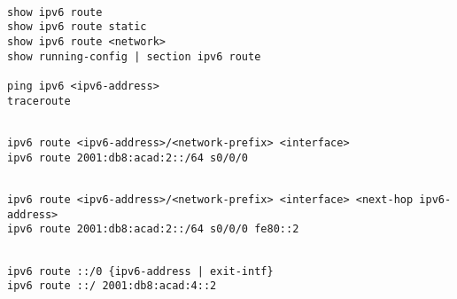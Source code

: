 \documentclass[../EngineeringJournal_CDavis.tex]{subfiles}
\begin{document}

\hspace{0.2cm}
\begin{tcolorbox}[width=6.3in]
\scriptsize
\begin{verbatim}

show ipv6 route
show ipv6 route static
show ipv6 route <network>
show running-config | section ipv6 route

ping ipv6 <ipv6-address>
traceroute

\end{verbatim}
\normalsize
\end{tcolorbox}
\hspace{0.2cm}


\hspace{0.2cm}
\begin{tcolorbox}[width=6.3in]
\scriptsize
\begin{verbatim}

ipv6 route <ipv6-address>/<network-prefix> <interface>
ipv6 route 2001:db8:acad:2::/64 s0/0/0

\end{verbatim}
\normalsize
\end{tcolorbox}
\hspace{0.2cm}


\hspace{0.2cm}
\begin{tcolorbox}[width=6.3in]
\scriptsize
\begin{verbatim}

ipv6 route <ipv6-address>/<network-prefix> <interface> <next-hop ipv6-address>
ipv6 route 2001:db8:acad:2::/64 s0/0/0 fe80::2

\end{verbatim}
\normalsize
\end{tcolorbox}
\hspace{0.2cm}


\hspace{0.2cm}
\begin{tcolorbox}[width=6.3in]
\scriptsize
\begin{verbatim}

ipv6 route ::/0 {ipv6-address | exit-intf}
ipv6 route ::/ 2001:db8:acad:4::2

\end{verbatim}
\normalsize
\end{tcolorbox}
\hspace{0.2cm}
\end{document}
